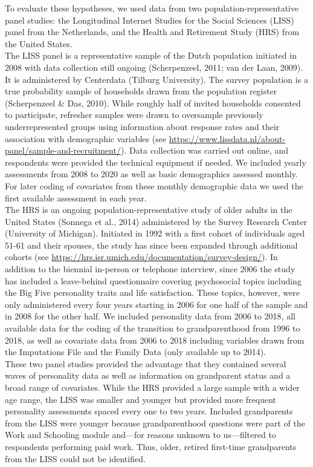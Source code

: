 \documentclass[
  english,
  man,floatsintext]{apa7}
\begin{document}
To evaluate these hypotheses, we used data from two population-representative panel studies: the Longitudinal Internet Studies for the Social Sciences (LISS) panel from the Netherlands, and the Health and Retirement Study (HRS) from the United States.\\
The LISS panel is a representative sample of the Dutch population initiated in 2008 with data collection still ongoing (Scherpenzeel, 2011; van der Laan, 2009). It is administered by Centerdata (Tilburg University). The survey population is a true probability sample of households drawn from the population register (Scherpenzeel \& Das, 2010). While roughly half of invited households consented to participate, refresher samples were drawn to oversample previously underrepresented groups using information about response rates and their association with demographic variables (see \url{https://www.lissdata.nl/about-panel/sample-and-recruitment/}). Data collection was carried out online, and respondents were provided the technical equipment if needed. We included yearly assessments from 2008 to 2020 as well as basic demographics assessed monthly. For later coding of covariates from these monthly demographic data we used the first available assessment in each year.\\
The HRS is an ongoing population-representative study of older adults in the United States (Sonnega et al., 2014) administered by the Survey Research Center (University of Michigan). Initiated in 1992 with a first cohort of individuals aged 51-61 and their spouses, the study has since been expanded through additional cohorts (see \url{https://hrs.isr.umich.edu/documentation/survey-design/}). In addition to the biennial in-person or telephone interview, since 2006 the study has included a leave-behind questionnaire covering psychosocial topics including the Big Five personality traits and life satisfaction. These topics, however, were only administered every four years starting in 2006 for one half of the sample and in 2008 for the other half. We included personality data from 2006 to 2018, all available data for the coding of the transition to grandparenthood from 1996 to 2018, as well as covariate data from 2006 to 2018 including variables drawn from the Imputations File and the Family Data (only available up to 2014).\\
These two panel studies provided the advantage that they contained several waves of personality data as well as information on grandparent status and a broad range of covariates. While the HRS provided a large sample with a wider age range, the LISS was smaller and younger but provided more frequent personality assessments spaced every one to two years. Included grandparents from the LISS were younger because grandparenthood questions were part of the Work and Schooling module and---for reasons unknown to us---filtered to respondents performing paid work. Thus, older, retired first-time grandparents from the LISS could not be identified.
\end{document}
